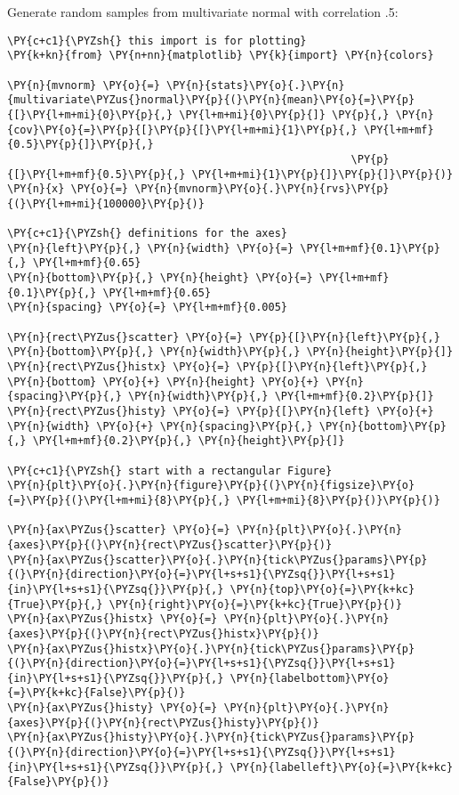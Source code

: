 Generate random samples from multivariate normal with correlation .5:

    \begin{tcolorbox}[breakable, size=fbox, boxrule=1pt, pad at break*=1mm,colback=cellbackground, colframe=cellborder]
\begin{Verbatim}[commandchars=\\\{\}]
\PY{c+c1}{\PYZsh{} this import is for plotting}
\PY{k+kn}{from} \PY{n+nn}{matplotlib} \PY{k}{import} \PY{n}{colors}

\PY{n}{mvnorm} \PY{o}{=} \PY{n}{stats}\PY{o}{.}\PY{n}{multivariate\PYZus{}normal}\PY{p}{(}\PY{n}{mean}\PY{o}{=}\PY{p}{[}\PY{l+m+mi}{0}\PY{p}{,} \PY{l+m+mi}{0}\PY{p}{]} \PY{p}{,} \PY{n}{cov}\PY{o}{=}\PY{p}{[}\PY{p}{[}\PY{l+m+mi}{1}\PY{p}{,} \PY{l+m+mf}{0.5}\PY{p}{]}\PY{p}{,}
                                                      \PY{p}{[}\PY{l+m+mf}{0.5}\PY{p}{,} \PY{l+m+mi}{1}\PY{p}{]}\PY{p}{]}\PY{p}{)}
\PY{n}{x} \PY{o}{=} \PY{n}{mvnorm}\PY{o}{.}\PY{n}{rvs}\PY{p}{(}\PY{l+m+mi}{100000}\PY{p}{)}

\PY{c+c1}{\PYZsh{} definitions for the axes}
\PY{n}{left}\PY{p}{,} \PY{n}{width} \PY{o}{=} \PY{l+m+mf}{0.1}\PY{p}{,} \PY{l+m+mf}{0.65}
\PY{n}{bottom}\PY{p}{,} \PY{n}{height} \PY{o}{=} \PY{l+m+mf}{0.1}\PY{p}{,} \PY{l+m+mf}{0.65}
\PY{n}{spacing} \PY{o}{=} \PY{l+m+mf}{0.005}

\PY{n}{rect\PYZus{}scatter} \PY{o}{=} \PY{p}{[}\PY{n}{left}\PY{p}{,} \PY{n}{bottom}\PY{p}{,} \PY{n}{width}\PY{p}{,} \PY{n}{height}\PY{p}{]}
\PY{n}{rect\PYZus{}histx} \PY{o}{=} \PY{p}{[}\PY{n}{left}\PY{p}{,} \PY{n}{bottom} \PY{o}{+} \PY{n}{height} \PY{o}{+} \PY{n}{spacing}\PY{p}{,} \PY{n}{width}\PY{p}{,} \PY{l+m+mf}{0.2}\PY{p}{]}
\PY{n}{rect\PYZus{}histy} \PY{o}{=} \PY{p}{[}\PY{n}{left} \PY{o}{+} \PY{n}{width} \PY{o}{+} \PY{n}{spacing}\PY{p}{,} \PY{n}{bottom}\PY{p}{,} \PY{l+m+mf}{0.2}\PY{p}{,} \PY{n}{height}\PY{p}{]}

\PY{c+c1}{\PYZsh{} start with a rectangular Figure}
\PY{n}{plt}\PY{o}{.}\PY{n}{figure}\PY{p}{(}\PY{n}{figsize}\PY{o}{=}\PY{p}{(}\PY{l+m+mi}{8}\PY{p}{,} \PY{l+m+mi}{8}\PY{p}{)}\PY{p}{)}

\PY{n}{ax\PYZus{}scatter} \PY{o}{=} \PY{n}{plt}\PY{o}{.}\PY{n}{axes}\PY{p}{(}\PY{n}{rect\PYZus{}scatter}\PY{p}{)}
\PY{n}{ax\PYZus{}scatter}\PY{o}{.}\PY{n}{tick\PYZus{}params}\PY{p}{(}\PY{n}{direction}\PY{o}{=}\PY{l+s+s1}{\PYZsq{}}\PY{l+s+s1}{in}\PY{l+s+s1}{\PYZsq{}}\PY{p}{,} \PY{n}{top}\PY{o}{=}\PY{k+kc}{True}\PY{p}{,} \PY{n}{right}\PY{o}{=}\PY{k+kc}{True}\PY{p}{)}
\PY{n}{ax\PYZus{}histx} \PY{o}{=} \PY{n}{plt}\PY{o}{.}\PY{n}{axes}\PY{p}{(}\PY{n}{rect\PYZus{}histx}\PY{p}{)}
\PY{n}{ax\PYZus{}histx}\PY{o}{.}\PY{n}{tick\PYZus{}params}\PY{p}{(}\PY{n}{direction}\PY{o}{=}\PY{l+s+s1}{\PYZsq{}}\PY{l+s+s1}{in}\PY{l+s+s1}{\PYZsq{}}\PY{p}{,} \PY{n}{labelbottom}\PY{o}{=}\PY{k+kc}{False}\PY{p}{)}
\PY{n}{ax\PYZus{}histy} \PY{o}{=} \PY{n}{plt}\PY{o}{.}\PY{n}{axes}\PY{p}{(}\PY{n}{rect\PYZus{}histy}\PY{p}{)}
\PY{n}{ax\PYZus{}histy}\PY{o}{.}\PY{n}{tick\PYZus{}params}\PY{p}{(}\PY{n}{direction}\PY{o}{=}\PY{l+s+s1}{\PYZsq{}}\PY{l+s+s1}{in}\PY{l+s+s1}{\PYZsq{}}\PY{p}{,} \PY{n}{labelleft}\PY{o}{=}\PY{k+kc}{False}\PY{p}{)}


\end{Verbatim}
\end{tcolorbox}
